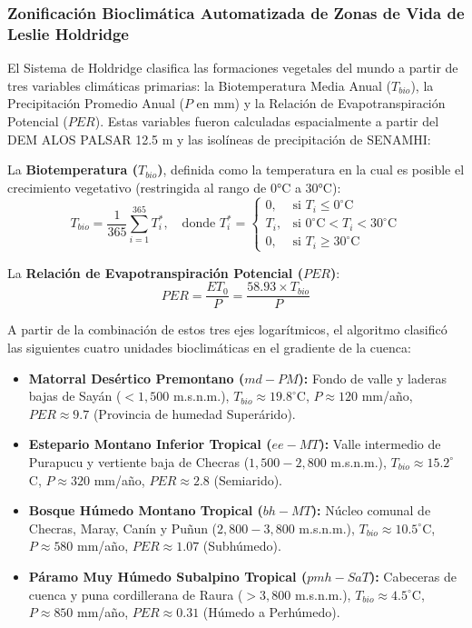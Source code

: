 \documentclass[11pt,a4paper]{article}
\begin{document}
\subsubsection{Zonificación Bioclimática Automatizada de Zonas de Vida de Leslie Holdridge}
El Sistema de Holdridge clasifica las formaciones vegetales del mundo a partir de tres variables climáticas primarias: la Biotemperatura Media Anual ($T_{bio}$), la Precipitación Promedio Anual ($P$ en mm) y la Relación de Evapotranspiración Potencial ($PER$). Estas variables fueron calculadas espacialmente a partir del DEM ALOS PALSAR 12.5 m y las isolíneas de precipitación de SENAMHI:

La \textbf{Biotemperatura ($T_{bio}$)}, definida como la temperatura en la cual es posible el crecimiento vegetativo (restringida al rango de 0°C a 30°C):
\begin{equation}
T_{bio} = \frac{1}{365} \sum_{i=1}^{365} T_i^*, \quad \text{donde } T_i^* = 
\begin{cases} 
0, & \text{si } T_i \le 0^\circ\text{C} \\
T_i, & \text{si } 0^\circ\text{C} < T_i < 30^\circ\text{C} \\
0, & \text{si } T_i \ge 30^\circ\text{C}
\end{cases}
\end{equation}

La \textbf{Relación de Evapotranspiración Potencial ($PER$)}:
\begin{equation}
PER = \frac{ET_0}{P} = \frac{58.93 \times T_{bio}}{P}
\end{equation}

A partir de la combinación de estos tres ejes logarítmicos, el algoritmo clasificó las siguientes cuatro unidades bioclimáticas en el gradiente de la cuenca:
\begin{itemize}[leftmargin=*]
    \item \textbf{Matorral Desértico Premontano ($md-PM$):} Fondo de valle y laderas bajas de Sayán ($<1,500$ m.s.n.m.), $T_{bio} \approx 19.8^\circ$C, $P \approx 120$ mm/año, $PER \approx 9.7$ (Provincia de humedad Superárido).
    \item \textbf{Estepario Montano Inferior Tropical ($ee-MT$):} Valle intermedio de Purapucu y vertiente baja de Checras ($1,500 - 2,800$ m.s.n.m.), $T_{bio} \approx 15.2^\circ$C, $P \approx 320$ mm/año, $PER \approx 2.8$ (Semiarido).
    \item \textbf{Bosque Húmedo Montano Tropical ($bh-MT$):} Núcleo comunal de Checras, Maray, Canín y Puñun ($2,800 - 3,800$ m.s.n.m.), $T_{bio} \approx 10.5^\circ$C, $P \approx 580$ mm/año, $PER \approx 1.07$ (Subhúmedo).
    \item \textbf{Páramo Muy Húmedo Subalpino Tropical ($pmh-SaT$):} Cabeceras de cuenca y puna cordillerana de Raura ($>3,800$ m.s.n.m.), $T_{bio} \approx 4.5^\circ$C, $P \approx 850$ mm/año, $PER \approx 0.31$ (Húmedo a Perhúmedo).
\end{itemize}
\end{document}
